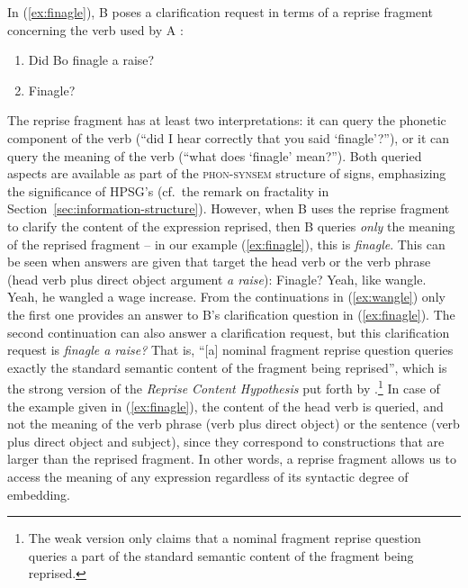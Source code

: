 \documentclass[output=paper
 	        ,biblatex
                ,babelshorthands
                ,newtxmath
                ,draftmode
                ,colorlinks, citecolor=brown
]{langscibook}
\begin{document}
In (\ref{ex:finagle}), B poses a clarification request in terms of a reprise fragment concerning the verb used by A \citep[]{Ginzburg:2012}:
%
\ea \label{ex:finagle}
\begin{enumerate}[noitemsep]
\item {} Did Bo finagle a raise?
\item {} Finagle?
\end{enumerate}
\z

\noindent
The reprise fragment has at least two interpretations: it can query the phonetic component of the verb (\enquote{did I hear correctly that you said \enquote{finagle}?}), or it can query the meaning of the verb (\enquote{what does \enquote{finagle} mean?}).
%
Both queried aspects are available as part of the \textsc{phon-synsem} structure of signs, emphasizing the significance of HPSG's  (cf.\ the remark on fractality in Section~\ref{sec:information-structure}).
%
However, when B uses the reprise fragment to clarify the content of the expression reprised, then B queries \emph{only} the meaning of the reprised fragment \citep{Purver:Ginzburg:2004,Ginzburg:Purver:2012} -- in our example (\ref{ex:finagle}), this is \textit{finagle}.
%
This can be seen when answers are given that target the head verb or the verb phrase (head verb plus direct object argument \textit{a raise}):
%
\ea \label{ex:wangle} Finagle?
 \ea Yeah, like wangle.
 \ex Yeah, he wangled a wage increase.
 \z 
\z
%
From the continuations in (\ref{ex:wangle}) only the first one provides an answer to B's clarification question in (\ref{ex:finagle}).
%
The second continuation can also answer a clarification request, but this clarification request is \textit{finagle a raise?}
%
That is, \enquote{[a] nominal fragment reprise question queries exactly the standard semantic content of the fragment being reprised}, which is the strong version of the \emph{Reprise Content Hypothesis} put forth by \citet[]{Purver:Ginzburg:2004}.\footnote{The weak version \citep[]{Purver:Ginzburg:2004} only claims that a nominal fragment reprise question queries a part of the standard semantic content of the fragment being reprised.}
%
In case of the example given in (\ref{ex:finagle}), the content of the head verb is queried, and not the meaning of the verb phrase (verb plus direct object) or the sentence (verb plus direct object and subject), since they correspond to constructions that are larger than the reprised fragment. 
%
In other words, a reprise fragment allows us to access the meaning of any expression regardless of its syntactic degree of embedding. 
\end{document}
